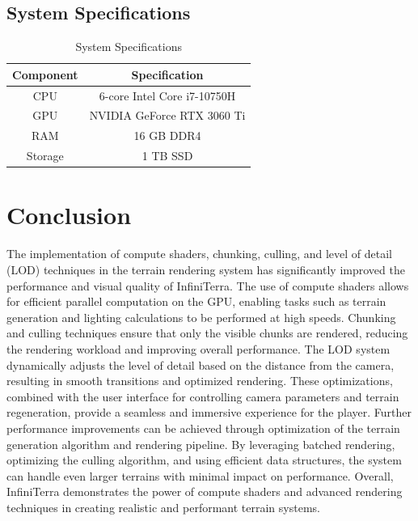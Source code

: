 \documentclass{article}
\begin{document}
\subsection{System Specifications}
\label{ch:system-specs}

\begin{table}[H]
	\centering
	\begin{tabular}{|c|c|}
		\hline
		\textbf{Component} & \textbf{Specification}      \\
		\hline
		CPU                & 6-core Intel Core i7-10750H \\
		\hline
		GPU                & NVIDIA GeForce RTX 3060 Ti  \\
		\hline
		RAM                & 16 GB DDR4                  \\
		\hline
		Storage            & 1 TB SSD                    \\
		\hline
	\end{tabular}
	\caption{System Specifications}
	\label{tab:system-specs}
\end{table}

\section{Conclusion}
\label{ch:conclusion}

The implementation of compute shaders, chunking, culling, and level of detail (LOD) techniques in
the terrain rendering system has significantly improved the performance and visual quality of
InfiniTerra. The use of compute shaders allows for efficient parallel computation on the GPU,
enabling tasks such as terrain generation and lighting calculations to be performed at high speeds.
Chunking and culling techniques ensure that only the visible chunks are rendered, reducing the
rendering workload and improving overall performance. The LOD system dynamically adjusts the level
of detail based on the distance from the camera, resulting in smooth transitions and optimized
rendering. These optimizations, combined with the user interface for controlling camera parameters
and terrain regeneration, provide a seamless and immersive experience for the player. Further
performance improvements can be achieved through optimization of the terrain generation algorithm
and rendering pipeline. By leveraging batched rendering, optimizing the culling algorithm, and
using efficient data structures, the system can handle even larger terrains with minimal impact on
performance. Overall, InfiniTerra demonstrates the power of compute shaders and advanced rendering
techniques in creating realistic and performant terrain systems.



\end{document}
